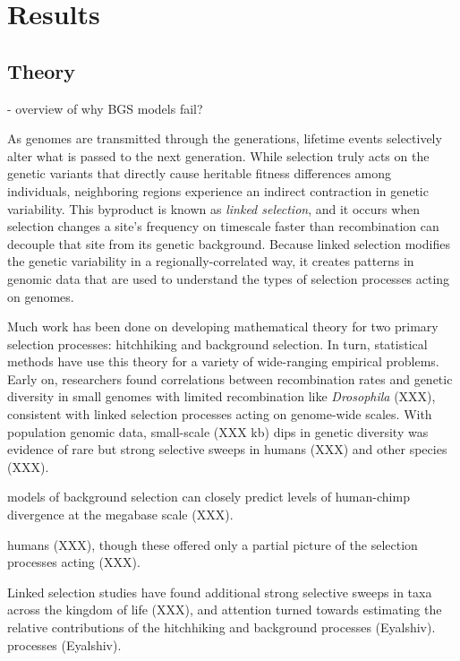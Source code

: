 \documentclass[11pt]{article}
\begin{document}
\section*{Results}

\subsection*{Theory}

- overview of why BGS models fail?


As genomes are transmitted through the generations, lifetime events selectively
alter what is passed to the next generation. While selection truly acts on the
genetic variants that directly cause heritable fitness differences among
individuals, neighboring regions experience an indirect contraction in genetic
variability. This byproduct is known as \emph{linked selection}, and it occurs
when selection changes a site's frequency on timescale faster than
recombination can decouple that site from its genetic background. Because
linked selection modifies the genetic variability in a regionally-correlated
way, it creates patterns in genomic data that are used to understand the types
of selection processes acting on genomes.

Much work has been done on developing mathematical theory for two primary
selection processes: hitchhiking and background selection. In turn, statistical
methods have use this theory for a variety of wide-ranging empirical problems.
Early on, researchers found correlations between recombination rates and
genetic diversity in small genomes with limited recombination like
\emph{Drosophila} (XXX), consistent with linked selection processes acting on
genome-wide scales. With population genomic data, small-scale (XXX kb) dips in
genetic diversity was evidence of rare but strong selective sweeps in humans
(XXX) and other species (XXX). 

models of background selection can
closely predict levels of human-chimp divergence at the megabase scale (XXX). 



humans (XXX), though these offered only a partial picture of the selection
processes acting (XXX). 

Linked
selection studies have found additional strong selective sweeps in taxa across
the kingdom of life (XXX), and attention turned towards estimating the relative
contributions of the hitchhiking and background processes (Eyalshiv).
processes (Eyalshiv). 
\end{document}
